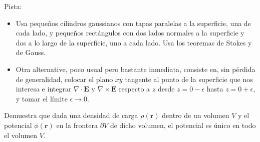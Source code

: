 \documentclass{exam}
\begin{document}
\begin{questions}
Pista:
\begin{itemize}
\item Usa pequeños cilindros gaussianos con tapas paralelas a la superficie,
una de cada lado, y pequeños rectángulos con dos lados normales a la
superficie y dos a lo largo de la superficie, uno a cada lado. Usa los
teoremas de Stokes y de Gauss.
\item Otra alternative, poco usual pero bastante inmediata, consiste en, sin pérdida de generalidad,
  colocar el plano $xy$ tangente al punto de la superficie que nos
  interesa e integrar $\nabla\cdot\bm E$ y $\nabla\times\bm E$
  respecto a $z$ desde
  $z=0-\epsilon$ hasta $z=0+\epsilon$, y tomar el límite
  $\epsilon\to0$.
\end{itemize}
\question
{}
\question Demuestra que dada una densidad de carga $\rho(\bm r)$
dentro de un volumen $V$ y el potencial $\phi(\bm r)$ en la frontera
$\partial V$ de dicho volumen, el potencial es único en todo el
volumen $V$.


\end{questions}
\end{document}
